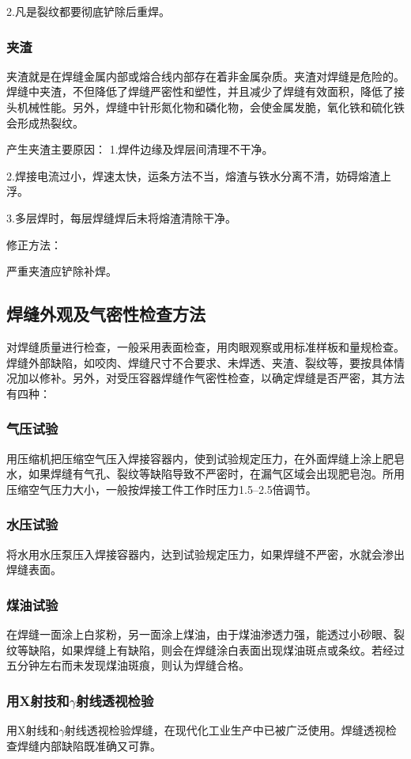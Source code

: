 \documentclass{ctexbook}
\begin{document}
2.凡是裂纹都要彻底铲除后重焊。
\subsubsection{夹渣}
夹渣就是在焊缝金属内部或熔合线内部存在着非金属杂质。夹渣对焊缝是危险的。焊缝中夹渣，不但降低了焊缝严密性和塑性，并且减少了焊缝有效面积，降低了接头机械性能。另外，焊缝中针形氮化物和磷化物，会使金属发脆，氧化铁和硫化铁会形成热裂纹。

产生夹渣主要原因：
1.焊件边缘及焊层间清理不干净。

2.焊接电流过小，焊速太快，运条方法不当，熔渣与铁水分离不清，妨碍熔渣上浮。

3.多层焊时，每层焊缝焊后未将熔渣清除干净。

修正方法：

严重夹渣应铲除补焊。
\subsection{焊缝外观及气密性检查方法}
对焊缝质量进行检查，一般采用表面检查，用肉眼观察或用标准样板和量规检查。焊缝外部缺陷，如咬肉、焊缝尺寸不合要求、未焊透、夹渣、裂纹等，要按具体情况加以修补。另外，对受压容器焊缝作气密性检查，以确定焊缝是否严密，其方法有四种：
\subsubsection{气压试验}
用压缩机把压缩空气压入焊接容器内，使到试验规定压力，在外面焊缝上涂上肥皂水，如果焊缝有气孔、裂纹等缺陷导致不严密时，在漏气区域会出现肥皂泡。所用压缩空气压力大小，一般按焊接工件工作时压力1.5--2.5倍调节。
\subsubsection{水压试验}
将水用水压泵压入焊接容器内，达到试验规定压力，如果焊缝不严密，水就会渗出焊缝表面。
\subsubsection{煤油试验}
在焊缝一面涂上白浆粉，另一面涂上煤油，由于煤油渗透力强，能透过小砂眼、裂纹等缺陷，如果焊缝上有缺陷，则会在焊缝涂白表面出现煤油斑点或条纹。若经过五分钟左右而未发现煤油斑痕，则认为焊缝合格。
\subsubsection{用X射技和$\gamma$射线透视检验}
用X射线和$\gamma$射线透视检验焊缝，在现代化工业生产中已被广泛使用。焊缝透视检查焊缝内部缺陷既准确又可靠。
\end{document}

